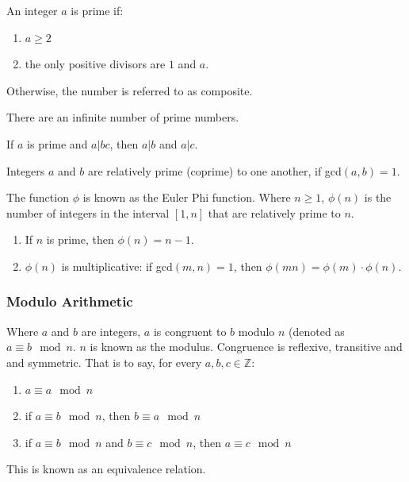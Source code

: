 \begin{mathdef}
	An integer $a$ is prime if:
	\begin{enumerate}
		\item $a\ge2$
		\item the only positive divisors are $1$ and $a$.
	\end{enumerate}
	Otherwise, the number is referred to as composite.
\end{mathdef}

\begin{mathfact}
	There are an infinite number of prime numbers.
\end{mathfact}

\begin{mathdef}
	If $a$ is prime and $a|bc$, then $a|b$ and $a|c$.
\end{mathdef}

\begin{mathdef}
	Integers $a$ and $b$ are relatively prime (coprime) to one another, if gcd$(a,b)=1$.
\end{mathdef}

\begin{mathdef}
	The function $\phi$ is known as the Euler Phi function. Where $n\ge1$, $\phi(n)$ is the number of integers in the interval $[1,n]$ that are relatively prime to $n$.
	\begin{enumerate}
		\item If $n$ is prime, then $\phi(n) = n - 1$.
		\item $\phi(n)$ is multiplicative: if gcd$(m,n) = 1$, then $\phi(mn) = \phi(m) \cdot  \phi(n)$.
	\end{enumerate}
\end{mathdef}

\subsubsection{Modulo Arithmetic}

\begin{mathdef}
	Where $a$ and $b$ are integers, $a$ is congruent to $b$ modulo $n$ (denoted as $a \equiv b  \mod n$. $n$ is known as the modulus. Congruence is reflexive, transitive and and symmetric. That is to say, for every $a,b,c \in \mathbb{Z}$:
	\begin{enumerate}
		\item $a \equiv a  \mod n$
		\item if $a \equiv b  \mod n$, then $b \equiv a  \mod n$
		\item if $a \equiv b  \mod n$ and $b \equiv c  \mod n$, then $a \equiv c  \mod n$
	\end{enumerate}
	This is known as an equivalence relation.
\end{mathdef}

